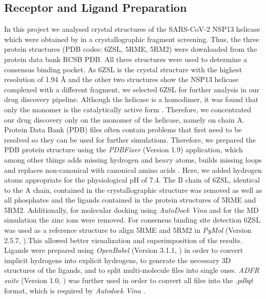 \documentclass[11pt, letterpaper, titlepage]{article}
\renewcommand{\cite}{\parencite}
\begin{document}
\subsection{Receptor and Ligand Preparation}
In this project we analysed crystal structures of the \ac{SARS-CoV-2} \ac{NSP13} helicase which were obtained by \cite{NSP13_basics} in a crystallographic fragment screening. Thus, the three protein structures (PDB codes: 6ZSL, 5RME, 5RM2) were downloaded from the protein data bank \ac{RCSB PDB}. All three structures were used to determine a consensus binding pocket. As 6ZSL is the crystal structure with the highest resolution of 1.94 {\AA} and the other two structures show the \ac{NSP13} helicase complexed with a different fragment, we selected 6ZSL for further analysis in our drug discovery pipeline. Although the helicase is a homodimer, it was found that only the monomer is the catalytically active form \cite{Berta_2021}. Therefore, we concentrated our drug discovery only on the monomer of the helicase, namely on chain A. \\
Protein Data Bank (PDB) files often contain problems that first need to be resolved so they can be used for further simulations. Therefore, we prepared the PDB protein structure using the \textit{PDBFixer} (Version 1.9) application, which among other things adds missing hydrogen and heavy atoms, builds missing loops and replaces non-canonical with canonical amino acids \cite{Eastman_2017}. Here, we added hydrogen atoms appropriate for the physiological pH of 7.4. The B chain of 6ZSL, identical to the A chain, contained in the crystallographic structure was removed as well as all phosphates and the ligands contained in the protein structures of 5RME and 5RM2. Additionally, for molecular docking using \textit{AutoDock Vina} %
and for the \ac{MD} simulation the zinc ions were removed. For consensus binding site detection 6ZSL was used as a reference structure to align 5RME and 5RM2 in \textit{PyMol} (Version 2.5.7, \textcite{PyMol_endnote}).This allowed better visualization and superimposition of the results.\\ 
Ligands were prepared using \textit{OpenBabel} (Version 3.1.1, \textcite{OpenBabel}) in order to convert implicit hydrogens into explicit hydrogens, to generate the necessary 3D structures of the ligands, and to split multi-molecule files into single ones. \textit{ADFR suite} (Version 1.0, \textcite{AutoDockFR}) was further used in order to convert all files into the \textit{.pdbqt} format, which is required by \textit{Autodock Vina} \cite{Trott.2010}. 
\end{document}
